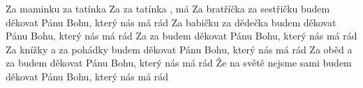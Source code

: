 \begin{TEXT}{Za maminku za tatínka}
\SLOKA Za  za tatínka   \NL
{} ,   má 
\SLOKA Za bratříčka za sestřičku budem děkovat \NL
Pánu Bohu, který nás má rád
\SLOKA Za babičku za dědečka budem děkovat \NL
Pánu Bohu, který nás má rád
\SLOKA Za  za  budem děkovat \NL
Pánu Bohu, který nás má rád
\SLOKA Za knížky a za pohádky budem děkovat \NL
Pánu Bohu, který nás má rád
\SLOKA Za oběd a za  budem děkovat \NL
Pánu Bohu, který nás má rád
\SLOKA Že na světě nejsme sami budem děkovat \NL
Pánu Bohu, který nás má rád
\end{TEXT}
